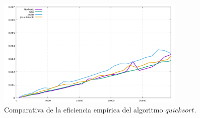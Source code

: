 \documentclass[11pt,a4paper]{article}
\begin{document}
\begin{figure}[H]
	\centering
	\includegraphics[width=0.8\textwidth]{../plots/quicksort}
	\caption{Comparativa de la eficiencia empírica del algoritmo $quicksort$.}
\end{figure}
\end{document}

